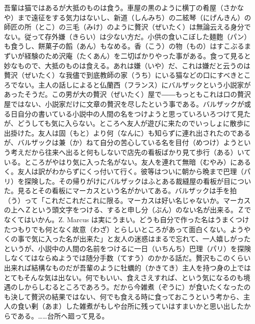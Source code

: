 \documentclass{book}
\begin{document}
吾輩は猫ではあるが大抵のものは食う。車屋の黒のように横丁の肴屋（さかなや）まで遠征をする気力はないし、新道（しんみち）の二絃琴（にげんきん）の師匠の所（とこ）の三毛（みけ）のように贅沢（ぜいたく）は無論云える身分でない。従って存外嫌（きらい）は少ない方だ。小供の食いこぼした麺麭（パン）も食うし、餅菓子の饀（あん）もなめる。香（こう）の物（もの）はすこぶるまずいが経験のため沢庵（たくあん）を二切ばかりやった事がある。食って見ると妙なもので、大抵のものは食える。あれは嫌（いや）だ、これは嫌だと云うのは贅沢（ぜいたく）な我儘で到底教師の家（うち）にいる猫などの口にすべきところでない。主人の話しによると仏蘭西（フランス）にバルザックという小説家があったそうだ。この男が大の贅沢（ぜいたく）屋で――もっともこれは口の贅沢屋ではない、小説家だけに文章の贅沢を尽したという事である。バルザックが或る日自分の書いている小説中の人間の名をつけようと思っていろいろつけて見たが、どうしても気に入らない。ところへ友人が遊びに来たのでいっしょに散歩に出掛けた。友人は固（もと）より何（なんに）も知らずに連れ出されたのであるが、バルザックは兼（か）ねて自分の苦心している名を目付（めつけ）ようという考えだから往来へ出ると何もしないで店先の看板ばかり見て歩行（ある）いている。ところがやはり気に入った名がない。友人を連れて無暗（むやみ）にあるく。友人は訳がわからずにくっ付いて行く。彼等はついに朝から晩まで巴理（パリ）を探険した。その帰りがけにバルザックはふとある裁縫屋の看板が目についた。見るとその看板にマーカスという名がかいてある。バルザックは手を拍（う）って「これだこれだこれに限る。マーカスは好い名じゃないか。マーカスの上へＺという頭文字をつける、すると申し分（ぶん）のない名が出来る。Ｚでなくてはいかん。Z. Marcus は実にうまい。どうも自分で作った名はうまくつけたつもりでも何となく故意（わざ）とらしいところがあって面白くない。ようやくの事で気に入った名が出来た」と友人の迷惑はまるで忘れて、一人嬉しがったというが、小説中の人間の名前をつけるに一日（いちんち）巴理（パリ）を探険しなくてはならぬようでは随分手数（てすう）のかかる話だ。贅沢もこのくらい出来れば結構なものだが吾輩のように牡蠣的（かきてき）主人を持つ身の上ではとてもそんな気は出ない。何でもいい、食えさえすれば、という気になるのも境遇のしからしむるところであろう。だから今雑煮（ぞうに）が食いたくなったのも決して贅沢の結果ではない、何でも食える時に食っておこうという考から、主人の食い剰（あま）した雑煮がもしや台所に残っていはすまいかと思い出したからである。\ldots{}\ldots{}台所へ廻って見る。
\end{document}
